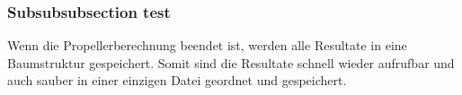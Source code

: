 \subsubsection{Subsubsubsection test}
\label{subsubsec:speichernderresultatematlab3}

Wenn die Propellerberechnung beendet ist, werden alle Resultate in eine Baumstruktur gespeichert. Somit sind die Resultate schnell wieder aufrufbar und auch sauber in einer einzigen Datei geordnet und gespeichert.\\

\newpage

